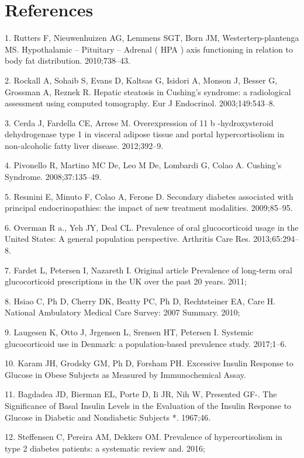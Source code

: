 \documentclass[11pt]{article} %
\begin{document}
\section*{References}

1. Rutters F, Nieuwenhuizen AG, Lemmens SGT, Born JM,
Westerterp-plantenga MS. Hypothalamic -- Pituitary -- Adrenal ( HPA )
axis functioning in relation to body fat distribution. 2010;738--43.

2. Rockall A, Sohaib S, Evans D, Kaltsas G, Isidori A, Monson J, Besser
G, Grossman A, Reznek R. Hepatic steatosis in Cushing's syndrome: a
radiological assessment using computed tomography. Eur J Endocrinol.
2003;149:543--8.

3. Cerda J, Fardella CE, Arrese M. Overexpression of 11 b
-hydroxysteroid dehydrogenase type 1 in visceral adipose tissue and
portal hypercortisolism in non-alcoholic fatty liver disease.
2012;392--9.

4. Pivonello R, Martino MC De, Leo M De, Lombardi G, Colao A. Cushing's
Syndrome. 2008;37:135--49.

5. Resmini E, Minuto F, Colao A, Ferone D. Secondary diabetes
associated with principal endocrinopathies: the impact of new treatment
modalities. 2009;85--95.

6. Overman R a., Yeh JY, Deal CL. Prevalence of oral glucocorticoid
usage in the United States: A general population perspective. Arthritis
Care Res. 2013;65:294--8.

7. Fardet L, Petersen I, Nazareth I. Original article Prevalence of
long-term oral glucocorticoid prescriptions in the UK over the past 20
years. 2011;

8. Hsiao C, Ph D, Cherry DK, Beatty PC, Ph D, Rechtsteiner EA, Care H.
National Ambulatory Medical Care Survey: 2007 Summary. 2010;

9. Laugesen K, Otto J, Jrgensen L, Srensen HT, Petersen I. Systemic
glucocorticoid use in Denmark: a population-based prevalence study.
2017;1--6.

10. Karam JH, Grodsky GM, Ph D, Forsham PH. Excessive Insulin Response
to Glucose in Obese Subjects as Measured by Immunochemical Assay.

11. Bagdadea JD, Bierman EL, Porte D, Ii JR, Nih W, Presented GF-. The
Significance of Basal Insulin Levels in the Evaluation of the Insulin
Response to Glucose in Diabetic and Nondiabetic Subjects *. 1967;46.

12. Steffensen C, Pereira AM, Dekkers OM. Prevalence of hypercortisolism
in type 2 diabetes patients: a systematic review and. 2016;
\end{document}
